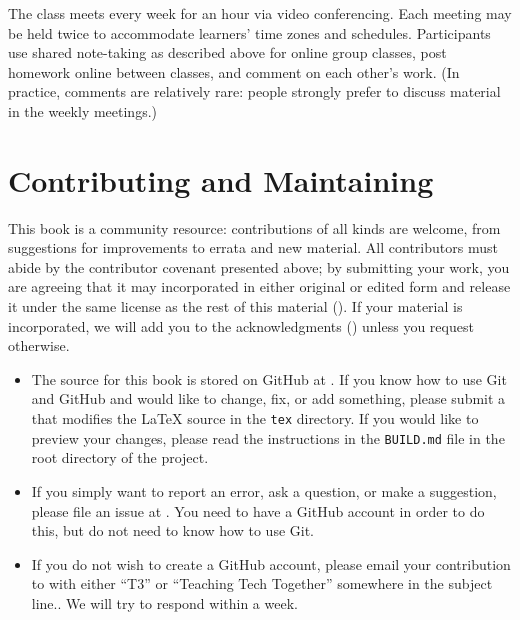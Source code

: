 The class meets every week for an hour via video conferencing. Each
meeting may be held twice to accommodate learners' time zones and
schedules.  Participants use shared note-taking as described above for
online group classes, post homework online between classes, and
comment on each other's work. (In practice, comments are relatively
rare: people strongly prefer to discuss material in the weekly
meetings.)

\section{Contributing and Maintaining}\label{s:joining-contributing}

This book is a community resource: contributions of all kinds are
welcome, from suggestions for improvements to errata and new material.
All contributors must abide by the contributor covenant presented
above; by submitting your work, you are agreeing that it may
incorporated in either original or edited form and release it under
the same license as the rest of this material ().
If your material is incorporated, we will add you to the
acknowledgments () unless you request
otherwise.

\begin{itemize}

\item
  The source for this book is stored on GitHub at {\repository}.  If
  you know how to use Git and GitHub and would like to change, fix, or
  add something, please submit a  that modifies the LaTeX source in the \texttt{tex}
  directory.  If you would like to preview your changes, please read
  the instructions in the \texttt{BUILD.md} file in the root directory
  of the project.

\item
  If you simply want to report an error, ask a question, or make a
  suggestion, please file an issue at {\repository}. You need to have
  a GitHub account in order to do this, but do not need to know how to
  use Git.

\item
  If you do not wish to create a GitHub account, please email your
  contribution to {\email} with either ``T3'' or ``Teaching Tech
  Together'' somewhere in the subject line..  We will try to respond
  within a week.

\end{itemize}

